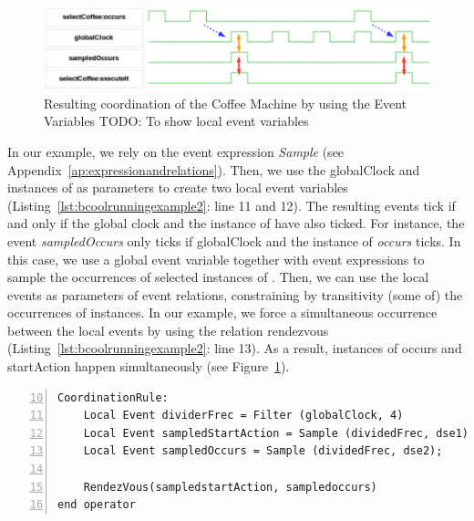 \begin{figure}[h]
	\center
	\includegraphics[width=.5\textwidth]{bcool/figs/runningeventvar}
	\caption{Resulting coordination of the Coffee Machine by using the Event Variables TODO: To show local event variables}
	\label{fig:runningeventvar}
\end{figure}

In our example, we rely on the event expression \emph{Sample} (see Appendix~\ref{ap:expressionandrelations}). Then, we use the globalClock and instances of \dse as parameters to create two local event variables (Listing~\ref{lst:bcoolrunningexample2}: line 11 and 12). The resulting events tick if and only if the global clock and the instance of \dse have also ticked. For instance, the event \emph{sampledOccurs} only ticks if globalClock and the instance of \dse \emph{occurs} ticks. In this case, we use a global event variable together with event expressions to sample the occurrences of selected instances of \dse. Then, we can use the local events as parameters of event relations, constraining by transitivity (some of) the occurrences of \dse instances. In our example, we force a simultaneous occurrence between the local events by using the relation rendezvous (Listing~\ref{lst:bcoolrunningexample2}: line 13). As a result, instances of \dse occurs and startAction happen simultaneously (see Figure~\ref{fig:runningeventvar}). 

\begin{lstlisting}[language=bcool,
caption={Synchronized product operator between the TFSM and Activity languages by using a Filter},
label={lst:bcoolrunningexample3}, 
basicstyle=\scriptsize\ttfamily, backgroundcolor=\color{LGrey}, numbers=left, firstnumber=10, xleftmargin=2pt]
CoordinationRule: 
	Local Event dividerFrec = Filter (globalClock, 4)
	Local Event sampledStartAction = Sample (dividedFrec, dse1);
	Local Event sampledOccurs = Sample (dividedFrec, dse2);

	RendezVous(sampledstartAction, sampledoccurs)
end operator
\end{lstlisting}

